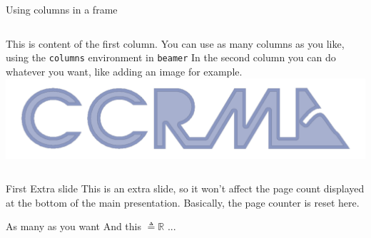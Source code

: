 \documentclass{beamer}
\begin{document}
\begin{frame}{Using columns in a frame}
    \begin{columns}[t]
            This is content of the first column. You can use as many columns as you like, using the \texttt{columns} environment in \texttt{beamer}
            In the second column you can do whatever you want, like adding an image for example.
            \includegraphics[width=\textwidth]{ccrma-logo.pdf}
    \end{columns}
\end{frame}



\appendix  %

\begin{frame}[plain]{First Extra slide}
This is an extra slide, so it won't affect the page count displayed at the bottom of the main presentation. Basically, the page counter is reset here.
\end{frame}

\begin{frame}[plain]{As many as you want}
And this $\triangleq \mathbb{R}$ ...
\end{frame}
\end{document}
